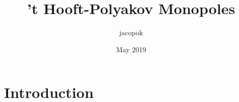 \documentclass{article}
\title{'t Hooft-Polyakov Monopoles}
\author{jacopok }
\date{May 2019}
\begin{document}
\maketitle

\section{Introduction}
\end{document}
